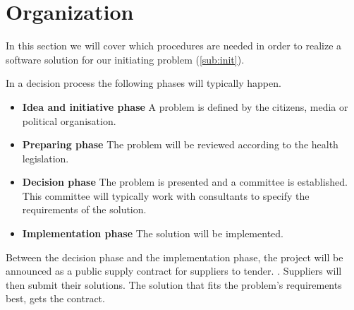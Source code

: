 \section{Organization} %
\label{sec:organization}

In this section we will cover which procedures are needed in order to realize a software solution for our initiating problem (\cref{sub:init}).

In a decision process the following phases will typically happen. \cite{Sjaelland}

\begin{itemize}
  \setlength{\itemsep}{1pt}
  \setlength{\parskip}{0pt}
  \setlength{\parsep}{0pt}
	\item \textbf{Idea and initiative phase} A problem is defined by the citizens, media or political organisation.
	\item \textbf{Preparing phase} The problem will be reviewed according to the health legislation.
	\item \textbf{Decision phase} The problem is presented and a committee is established. This committee will typically work with consultants to specify the requirements of the solution.
	\item \textbf{Implementation phase} The solution will be implemented. 
\end{itemize}


Between the decision phase and the implementation phase, the project will be announced as a public supply contract for suppliers to tender. \cite{Union2004}. Suppliers will then submit their solutions. The solution that fits the problem's requirements best, gets the contract. 

